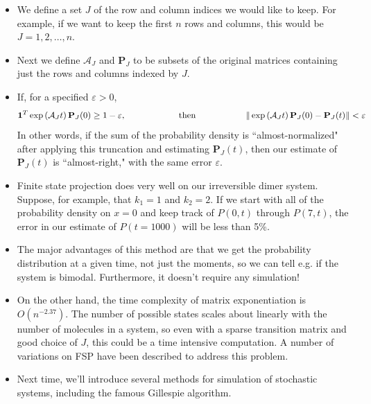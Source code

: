 \documentclass{article}
\begin{document}
\begin{itemize}
\item We define a set $J$ of the row and column indices we would like to keep. For example, if we want to keep the first $n$ rows and columns, this would be $J = {1, 2, \ldots, n}$.
\item Next we define $\mathcal{A}_J$ and $\mathbf{P}_J$ to be subsets of the original matrices containing just the rows and columns indexed by $J$.
\item If, for a specified $\varepsilon >0$,
\[ \mathbf{1}^T \exp \left(\mathcal{A}_J t \right) \mathbf{P}_J (0) \geq 1 - \varepsilon, \hspace{2 cm} \textrm{ then} \hspace{2 cm} \| \exp \left(\mathcal{A}_J t \right) \mathbf{P}_J (0) - \mathbf{P}_J (t) \| < \varepsilon \]
In other words, if the sum of the probability density is ``almost-normalized" after applying this truncation and estimating $\mathbf{P}_J (t)$, then our estimate of $\mathbf{P}_J (t)$ is ``almost-right," with the same error $\varepsilon$.
\item Finite state projection does very well on our irreversible dimer system. Suppose, for example, that $k_1=1$ and $k_2=2$. If we start with all of the probability density on $x=0$ and keep track of $P(0,t)$ through $P(7,t)$, the error in our estimate of $P(t=1000)$ will be less than 5\%.
\item The major advantages of this method are that we get the probability distribution at a given time, not just the moments, so we can tell e.g. if the system is bimodal. Furthermore, it doesn't require any simulation!
\item On the other hand, the time complexity of matrix exponentiation is $O(n^{-2.37})$. The number of possible states scales about linearly with the number of molecules in a system, so even with a sparse transition matrix and good choice of $J$, this could be a time intensive computation. A number of variations on FSP have been described to address this problem.
\item Next time, we'll introduce several methods for simulation of stochastic systems, including the famous Gillespie algorithm.
\end{itemize}
\end{document}
